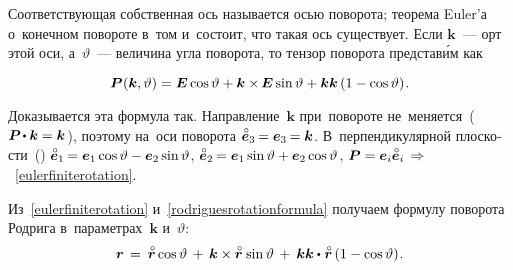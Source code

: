 \begin{otherlanguage}{russian}
\vspace{-0.5em} \noindent Соответствующая собственная ось называется осью поворота; теорема Euler’а о~конечном повороте в~том и~состоит, что такая ось существует. Если ${\bm{k}}$~--- орт этой оси, а~${\vartheta}$~--- величина угла поворота, то тензор поворота представ\'{и}м как

\nopagebreak\vspace{-0.1em}\begin{equation}\label{eulerfiniterotation}
\bm{P}\hspace{0.1ex}(\bm{k},\vartheta) = \bm{E} \operatorname{cos} \vartheta + \bm{k} \times\hspace{-0.2ex} \bm{E} \operatorname{sin} \vartheta + \bm{k} \bm{k} \left({1 - \operatorname{cos} \vartheta}\right) \hspace{-0.2ex} .
\end{equation}

\vspace{-0.1em} Доказывается эта формула так. Направление~${\bm{k}}$ при~повороте не~меняется~(${\bm{P} \hspace{-0.2ex}\dotp \bm{k} = \bm{k}\hspace{0.12ex}}$), поэтому на~оси поворота ${\mathcircabove{\bm{e}}_3 \hspace{-0.16ex} = \bm{e}_3 \hspace{-0.16ex} = \bm{k}}$. В~перпендикулярной плоскости~() ${\mathcircabove{\bm{e}}_1 \hspace{-0.16ex} = \bm{e}_1 \operatorname{cos} \vartheta - \bm{e}_2 \operatorname{sin} \vartheta}$, ${\mathcircabove{\bm{e}}_2 \hspace{-0.16ex} = \bm{e}_1 \operatorname{sin} \vartheta + \bm{e}_2 \operatorname{cos} \vartheta}$, ${\bm{P} = \bm{e}_i \mathcircabove{\bm{e}}_i \,\Rightarrow\hspace{.2ex}}$~\eqref{eulerfiniterotation}.



Из~\eqref{eulerfiniterotation} и~\eqref{rodriguesrotationformula} получаем формулу поворота Родрига в~параметрах~$\bm{k}$ и~$\vartheta$:
\nopagebreak\vspace{-0.2em}\begin{equation*}
\bm{r} \hspace{0.4ex}=\hspace{0.5ex} \mathcircabove{\bm{r}} \operatorname{cos} \vartheta \hspace{0.4ex}+\hspace{0.4ex} \bm{k} \times \mathcircabove{\bm{r}} \hspace{0.2ex} \operatorname{sin} \vartheta \hspace{0.4ex}+\hspace{0.5ex} \bm{k} \bm{k} \dotp\hspace{0.1ex} \mathcircabove{\bm{r}} \left({1 - \operatorname{cos} \vartheta}\right) \hspace{-0.25ex}.
\end{equation*}


\end{otherlanguage}
